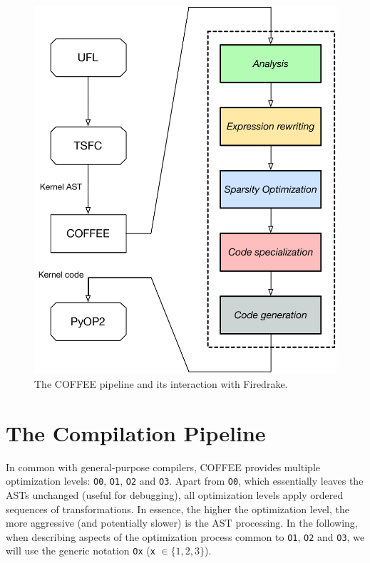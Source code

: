 \begin{figure}
\centering
\includegraphics[scale=0.50]{coffee/pictures/coffee-pipeline.pdf}
\caption{The COFFEE pipeline and its interaction with Firedrake.}
\label{fig:coffee-pipeline}
\end{figure}

\section{The Compilation Pipeline}
\label{sec:coffee:pipeline}
In common with general-purpose compilers, COFFEE provides multiple optimization levels: \texttt{O0}, \texttt{O1}, \texttt{O2} and \texttt{O3}. Apart from \texttt{O0}, which essentially leaves the ASTs unchanged (useful for debugging), all optimization levels apply ordered sequences of transformations. In essence, the higher the optimization level, the more aggressive (and potentially slower) is the AST processing. In the following, when describing aspects of the optimization process common to \texttt{O1}, \texttt{O2} and \texttt{O3}, we will use the generic notation \texttt{Ox} (\texttt{x} $\in \lbrace 1, 2, 3\rbrace$).

